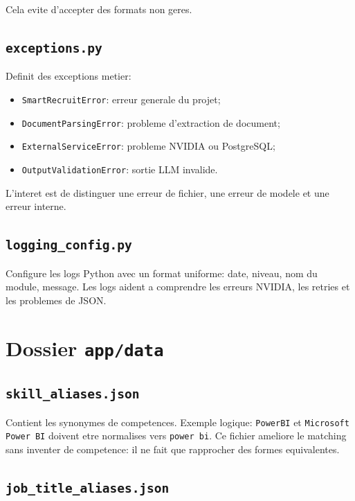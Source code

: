 \documentclass[12pt,a4paper]{article}
\begin{document}
Cela evite d'accepter des formats non geres.

\subsection{\texttt{exceptions.py}}

Definit des exceptions metier:

\begin{itemize}
  \item \texttt{SmartRecruitError}: erreur generale du projet;
  \item \texttt{DocumentParsingError}: probleme d'extraction de document;
  \item \texttt{ExternalServiceError}: probleme NVIDIA ou PostgreSQL;
  \item \texttt{OutputValidationError}: sortie LLM invalide.
\end{itemize}

L'interet est de distinguer une erreur de fichier, une erreur de modele et une erreur interne.

\subsection{\texttt{logging\_config.py}}

Configure les logs Python avec un format uniforme: date, niveau, nom du module, message. Les logs aident a comprendre les erreurs NVIDIA, les retries et les problemes de JSON.

\section{Dossier \texttt{app/data}}

\subsection{\texttt{skill\_aliases.json}}

Contient les synonymes de competences. Exemple logique: \texttt{PowerBI} et \texttt{Microsoft Power BI} doivent etre normalises vers \texttt{power bi}. Ce fichier ameliore le matching sans inventer de competence: il ne fait que rapprocher des formes equivalentes.

\subsection{\texttt{job\_title\_aliases.json}}
\end{document}
